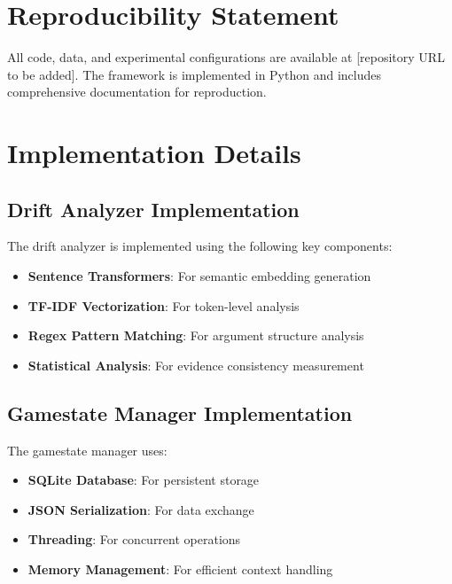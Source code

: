 \documentclass[11pt]{article}
\begin{document}
\section*{Reproducibility Statement}

All code, data, and experimental configurations are available at [repository URL to be added]. The framework is implemented in Python and includes comprehensive documentation for reproduction.




\appendix

\section{Implementation Details}

\subsection{Drift Analyzer Implementation}

The drift analyzer is implemented using the following key components:

\begin{itemize}
    \item \textbf{Sentence Transformers}: For semantic embedding generation
    \item \textbf{TF-IDF Vectorization}: For token-level analysis
    \item \textbf{Regex Pattern Matching}: For argument structure analysis
    \item \textbf{Statistical Analysis}: For evidence consistency measurement
\end{itemize}

\subsection{Gamestate Manager Implementation}

The gamestate manager uses:

\begin{itemize}
    \item \textbf{SQLite Database}: For persistent storage
    \item \textbf{JSON Serialization}: For data exchange
    \item \textbf{Threading}: For concurrent operations
    \item \textbf{Memory Management}: For efficient context handling
\end{itemize}
\end{document}

